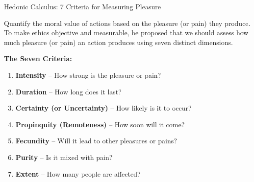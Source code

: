 \documentclass[aspectratio=169, 10pt]{beamer}
\begin{document}
\begin{frame}{Hedonic Calculus: 7 Criteria for Measuring Pleasure}

Quantify the moral value of actions based on the pleasure (or pain) they produce. To make ethics objective and measurable, he proposed that we should assess how much pleasure (or pain) an action produces using seven distinct dimensions. \\

\vspace{1em}

\textbf{The Seven Criteria:}
\begin{enumerate}
    \item \textbf{Intensity} – How strong is the pleasure or pain? \\
    
    \item \textbf{Duration} – How long does it last? \\
    
    \item \textbf{Certainty (or Uncertainty)} – How likely is it to occur? \\
    
    \item \textbf{Propinquity (Remoteness)} – How soon will it come? \\
    
    \item \textbf{Fecundity} – Will it lead to other pleasures or pains? \\
    
    \item \textbf{Purity} – Is it mixed with pain? \\
    
    \item \textbf{Extent} – How many people are affected? \\
\end{enumerate}

\end{frame}
\end{document}

